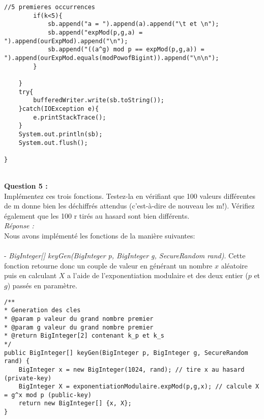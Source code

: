 \documentclass[a4paper,11pt]{article}
\begin{document}
\begin{lstlisting}[caption={testExpMod}, captionpos=b,breaklines = true]
        //5 premieres occurrences
        if(k<5){
            sb.append("a = ").append(a).append("\t et \n");
            sb.append("expMod(p,g,a) = ").append(ourExpMod).append("\n");
            sb.append("((a^g) mod p == expMod(p,g,a)) = ").append(ourExpMod.equals(modPowofBigint)).append("\n\n");
        }

    }
    try{
        bufferedWriter.write(sb.toString());
    }catch(IOException e){
        e.printStackTrace();
    }
    System.out.println(sb);
    System.out.flush();

}\end{lstlisting}

        \textbf{\\Question 5 : \\}Implémentez ces trois fonctions. Testez-la en vérifiant que 100 valeurs différentes de m donne bien les déchiffrés attendus (c’est-à-dire de nouveau les m!). Vérifiez également que les 100 r tirés au hasard sont bien différents.
        \textit{\\Réponse :}\\Nous avons implémenté les fonctions de la manière suivantes: \\\\ - \textit{BigInteger[] keyGen(BigInteger p, BigInteger g, SecureRandom rand)}. Cette fonction retourne donc un couple de valeur en générant un nombre $x$ aléatoire puis en calculant $X$ a l'aide de l'exponentiation modulaire et des deux entier ($p$ et $g$) passés en paramètre.
        \\\begin{lstlisting}[caption=keyGen, captionpos=b,breaklines = true]
/**
* Generation des cles
* @param p valeur du grand nombre premier
* @param g valeur du grand nombre premier
* @return BigInteger[2] contenant k_p et k_s
*/
public BigInteger[] keyGen(BigInteger p, BigInteger g, SecureRandom rand) {
    BigInteger x = new BigInteger(1024, rand); // tire x au hasard (private-key)
    BigInteger X = exponentiationModulaire.expMod(p,g,x); // calcule X = g^x mod p (public-key)
    return new BigInteger[] {x, X};
}
        \end{lstlisting}
\end{document}
